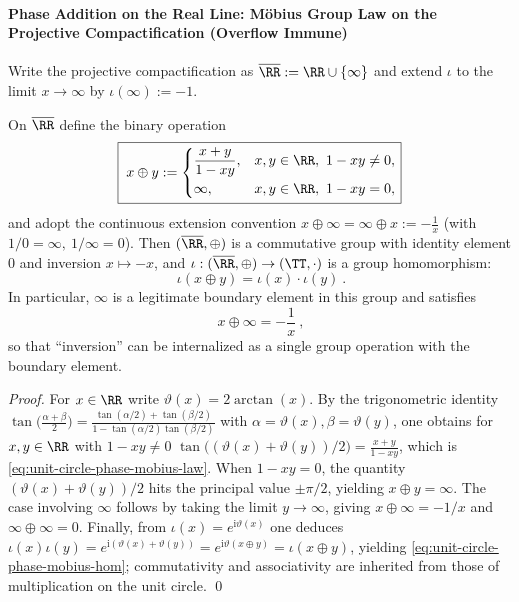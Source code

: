 \paragraph{Phase Addition on the Real Line: M\"obius Group Law on the Projective Compactification (Overflow Immune)}
Write the projective compactification as \(\overline{\RR}:=\RR\cup\{\infty\}\) and extend \(\iota\) to the limit \(x\to\infty\) by \(\iota(\infty):=-1\).
\begin{proposition}\label{prop:unit-circle-phase-mobius-law}
On \(\overline{\RR}\) define the binary operation
\begin{equation}\label{eq:unit-circle-phase-mobius-law}
\boxed{\;
x\oplus y:=
\begin{cases}
\dfrac{x+y}{1-xy}, & x,y\in\RR,\ 1-xy\neq 0,\\[6pt]
\infty, & x,y\in\RR,\ 1-xy=0,
\end{cases}
}
\end{equation}
and adopt the continuous extension convention
\(
x\oplus \infty=\infty\oplus x:=-\frac{1}{x}
\)
(with \(1/0=\infty,\ 1/\infty=0\)).
Then \((\overline{\RR},\oplus)\) is a commutative group with identity element \(0\) and inversion \(x\mapsto -x\), and \(\iota:(\overline{\RR},\oplus)\to(\TT,\cdot)\) is a group homomorphism:
\begin{equation}\label{eq:unit-circle-phase-mobius-hom}
\boxed{\ \iota(x\oplus y)=\iota(x)\cdot\iota(y)\ }.
\end{equation}
In particular, \(\infty\) is a legitimate boundary element in this group and satisfies
\begin{equation}\label{eq:unit-circle-phase-inversion-as-translation}
\boxed{\ x\oplus\infty=-\frac1x\ },
\end{equation}
so that ``inversion'' can be internalized as a single group operation with the boundary element.
\end{proposition}
\begin{proof}
For \(x\in\RR\) write \(\vartheta(x)=2\arctan(x)\).
By the trigonometric identity
\(
\tan\!\bigl(\frac{\alpha+\beta}{2}\bigr)=\frac{\tan(\alpha/2)+\tan(\beta/2)}{1-\tan(\alpha/2)\tan(\beta/2)}
\)
with \(\alpha=\vartheta(x),\beta=\vartheta(y)\), one obtains for \(x,y\in\RR\) with \(1-xy\neq 0\)
\(
\tan\!\bigl((\vartheta(x)+\vartheta(y))/2\bigr)=\frac{x+y}{1-xy}
\), which is \eqref{eq:unit-circle-phase-mobius-law}.
When \(1-xy=0\), the quantity \((\vartheta(x)+\vartheta(y))/2\) hits the principal value \(\pm\pi/2\), yielding \(x\oplus y=\infty\).
The case involving \(\infty\) follows by taking the limit \(y\to\infty\), giving \(x\oplus\infty=-1/x\) and \(\infty\oplus\infty=0\).
Finally, from
\(
\iota(x)=e^{\mathrm{i}\vartheta(x)}
\)
one deduces
\(
\iota(x)\iota(y)=e^{\mathrm{i}(\vartheta(x)+\vartheta(y))}=e^{\mathrm{i}\vartheta(x\oplus y)}=\iota(x\oplus y)
\), yielding \eqref{eq:unit-circle-phase-mobius-hom}; commutativity and associativity are inherited from those of multiplication on the unit circle. \qed
\end{proof}

